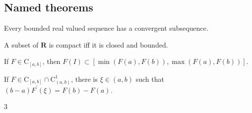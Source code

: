 \documentclass[letterpaper,landscape,9pt,fleqn]{extarticle}
\newcommand{\reals}{\mathbf{R}}
\begin{document}
\begin{multicols*}{3}
\section*{Named theorems}
    \begin{description}[\itemsep=0em]
    \item[Bolzano-Weirstrass] Every bounded real valued sequence has a convergent subsequence.
    \item[Heine–Borel] A subset of $\reals$ is compact iff it is closed and bounded.
    \item[ Intermediate value theorem ] If $F \in \mathrm{C}_{[a,b]}$, then
         $F(I) \subset [\min(F(a),F(b)), \max(F(a),F(b))]$.
    \item[Mean Value]  If $F \in \mathrm{C}_{[a,b]} \cap \mathrm{C}_{(a,b)}^1$, 
    there is $\xi \in (a,b) $ such that $(b-a) F^\prime(\xi) = F(b) - F(a)$.
\end{description}

\vfill
{}

\end{multicols*}{3}
\end{document}
